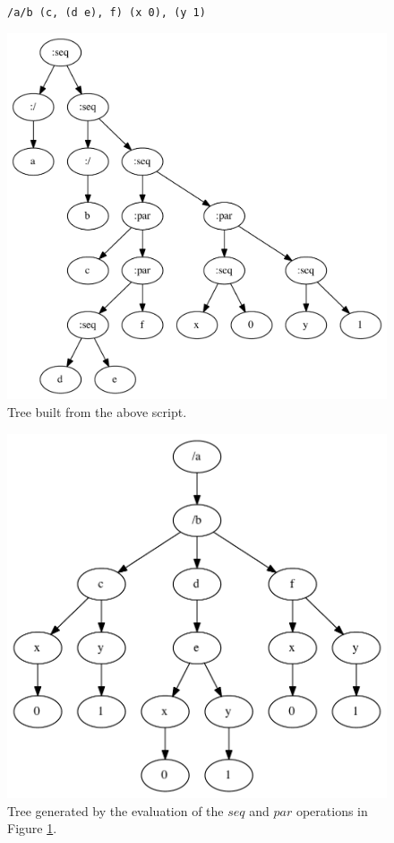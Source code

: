 \documentclass{article}
\newcommand{\code}	[2][0.9]		{\vspace{0mm}\begin{center}\colorbox{mygrey}{
							\begin{minipage}[t]{#1\columnwidth} 
							{\small \texttt{#2}}
							\end{minipage}}\end{center}}
\begin{document}
\begin{figure}[htbp]
\code{/a/b (c, (d e), f) (x 0), (y 1)}
\begin{center}
\includegraphics[width=1.0\columnwidth]{parse/sample1}
\caption{Tree built from the above script.}
\label{parsesample1}
\end{center}
\end{figure}

\begin{figure}[htbp]
\begin{center}
\includegraphics[width=0.8\columnwidth]{eval/sample1}
\caption{Tree generated by the evaluation of the $seq$ and $par$ operations in Figure \ref{parsesample1}.}
\label{treesample1}
\end{center}
\end{figure}
\end{document}
